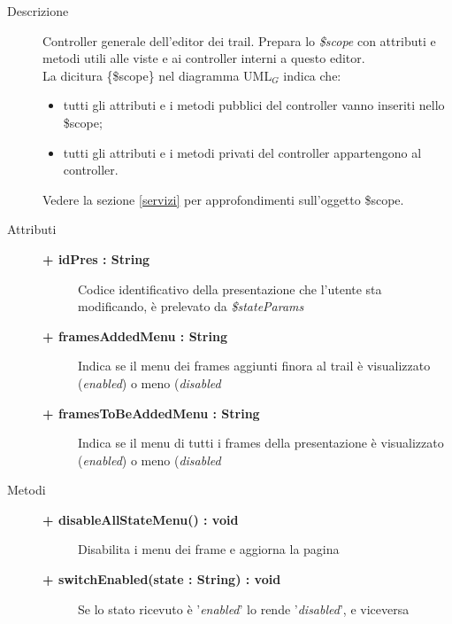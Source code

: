 \begin{description}
\item[Descrizione] \hfill
	Controller generale dell'editor dei trail. Prepara lo \textit{\$scope} con attributi e metodi utili alle viste e ai controller interni a questo editor.
	\\ La dicitura \{\$scope\} nel diagramma UML$_G$ indica che:
\begin{itemize}
\item tutti gli attributi e i metodi pubblici del controller vanno inseriti nello \$scope;
\item tutti gli attributi e i metodi privati del controller appartengono al controller.
\end{itemize}
Vedere la sezione \ref{servizi} per approfondimenti sull'oggetto \$scope.
	
	
\item[Attributi] \hfill
	\begin{description}
		\item[\textbf{+ idPres : String			}] \hfill
			Codice identificativo della presentazione che l'utente sta modificando, è prelevato da \textit{\$stateParams}
		\item[\textbf{+ framesAddedMenu	: String		}] \hfill
			Indica se il menu dei frames aggiunti finora al trail è visualizzato (\textit{enabled}) o meno (\textit{disabled}
		\item[\textbf{+ framesToBeAddedMenu	: String		}] \hfill
			Indica se il menu di tutti i frames della presentazione è visualizzato (\textit{enabled}) o meno (\textit{disabled}
	\end{description}
	
	
\item[Metodi] \hfill

	\begin{description}
		\item[\textbf{\color{blue}+ disableAllStateMenu() : void			}] \hfill
			Disabilita i menu dei frame e aggiorna la pagina

	\end{description}
	
	\begin{description}
		\item[\textbf{\color{blue}+ switchEnabled(state : String) : void			}] \hfill
			Se lo stato ricevuto è '\textit{enabled}' lo rende '\textit{disabled}', e viceversa
			

\end{description}
\end{description}
